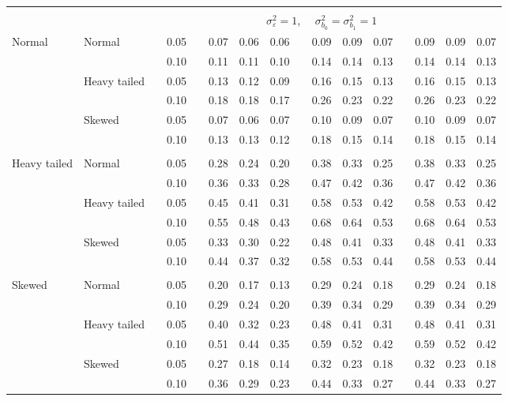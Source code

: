 \documentclass{article} %
\begin{document}
\begin{table}[ht]
\begin{scriptsize}
\begin{center}
\begin{tabular}{ll p{.1cm} c p{.1cm} rrr p{.1cm} rrr p{.1cm} rrr}
&&&&&&&&&&&&&&&\\
& && && \multicolumn{9}{c}{$\sigma_{\varepsilon}^2 = 1$, \ \ $\sigma_{b_0}^2 = \sigma_{b_1}^2 = 1$} \\ \cline{6-16}
Normal       & Normal       && 0.05 &&   0.07 & 0.06 & 0.06 && 0.09 & 0.09 & 0.07 && 0.09 & 0.09 & 0.07 \\ 
             &              && 0.10 &&   0.11 & 0.11 & 0.10 && 0.14 & 0.14 & 0.13 && 0.14 & 0.14 & 0.13 \\ 
             & Heavy tailed && 0.05 &&   0.13 & 0.12 & 0.09 && 0.16 & 0.15 & 0.13 && 0.16 & 0.15 & 0.13 \\ 
             &              && 0.10 &&   0.18 & 0.18 & 0.17 && 0.26 & 0.23 & 0.22 && 0.26 & 0.23 & 0.22 \\ 
             & Skewed       && 0.05 &&   0.07 & 0.06 & 0.07 && 0.10 & 0.09 & 0.07 && 0.10 & 0.09 & 0.07 \\ 
             &              && 0.10 &&   0.13 & 0.13 & 0.12 && 0.18 & 0.15 & 0.14 && 0.18 & 0.15 & 0.14 \\ 
             &&&&&&&&&&&&&&&\\
Heavy tailed & Normal       && 0.05 &&   0.28 & 0.24 & 0.20 && 0.38 & 0.33 & 0.25 && 0.38 & 0.33 & 0.25 \\ 
             &              && 0.10 &&   0.36 & 0.33 & 0.28 && 0.47 & 0.42 & 0.36 && 0.47 & 0.42 & 0.36 \\ 
             & Heavy tailed && 0.05 &&   0.45 & 0.41 & 0.31 && 0.58 & 0.53 & 0.42 && 0.58 & 0.53 & 0.42 \\ 
             &              && 0.10 &&   0.55 & 0.48 & 0.43 && 0.68 & 0.64 & 0.53 && 0.68 & 0.64 & 0.53 \\ 
             & Skewed       && 0.05 &&   0.33 & 0.30 & 0.22 && 0.48 & 0.41 & 0.33 && 0.48 & 0.41 & 0.33 \\ 
             &              && 0.10 &&   0.44 & 0.37 & 0.32 && 0.58 & 0.53 & 0.44 && 0.58 & 0.53 & 0.44 \\ 
             &&&&&&&&&&&&&&&\\
Skewed       & Normal       && 0.05 &&   0.20 & 0.17 & 0.13 && 0.29 & 0.24 & 0.18 && 0.29 & 0.24 & 0.18 \\ 
             &              && 0.10 &&   0.29 & 0.24 & 0.20 && 0.39 & 0.34 & 0.29 && 0.39 & 0.34 & 0.29 \\ 
             & Heavy tailed && 0.05 &&   0.40 & 0.32 & 0.23 && 0.48 & 0.41 & 0.31 && 0.48 & 0.41 & 0.31 \\ 
             &              && 0.10 &&   0.51 & 0.44 & 0.35 && 0.59 & 0.52 & 0.42 && 0.59 & 0.52 & 0.42 \\ 
             & Skewed       && 0.05 &&   0.27 & 0.18 & 0.14 && 0.32 & 0.23 & 0.18 && 0.32 & 0.23 & 0.18 \\ 
             &              && 0.10 &&   0.36 & 0.29 & 0.23 && 0.44 & 0.33 & 0.27 && 0.44 & 0.33 & 0.27 \\ 



\end{tabular}
\end{center}
\end{scriptsize}
\end{table}
\end{document}
